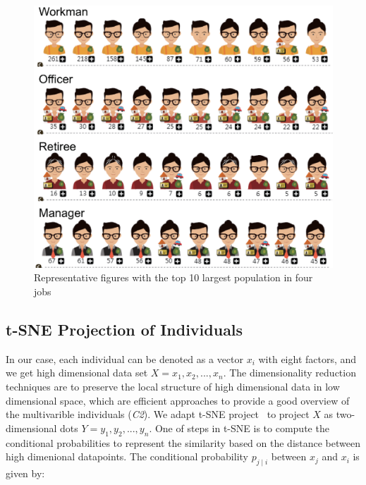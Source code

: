  
\begin{figure}[htb!]
 \centering %
 \includegraphics[width=\columnwidth]{pictures/design_example}
 \caption{Representative figures with the top 10 largest population in four jobs}
 \label{fig:div_example}
\end{figure}

\subsection{t-SNE Projection of Individuals}




In our case, each individual can be denoted as a vector $x_i$ with eight factors, and we get high dimensional data set $X={x_1, x_2, ..., x_n}$. The dimensionality reduction techniques are to preserve the local structure of high dimensional data in low dimensional space, which are efficient approaches to provide a good overview of the multivarible individuals (\textit{C2}). We adapt t-SNE project~\cite{maaten2008visualizing} to project $X$ as two-dimensional dots $Y={y_1, y_2, ..., y_n}$. One of steps in t-SNE is to compute the conditional probabilities to represent the similarity based on the distance between high dimenional datapoints. The conditional probability $p_{j\mid i}$ between $x_j$ and $x_i$ is given by:

